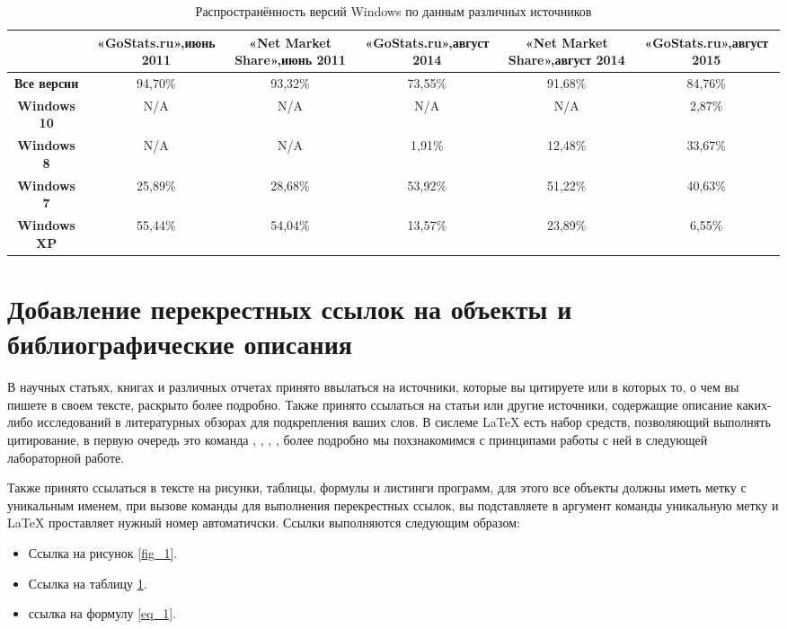 \documentclass{article} %
\begin{document}
\begin{table}[!h] %
	\centering %
	\caption{Распространённость версий Windows по данным различных источников} \label{tab_1} %
    \begin{tabular}{ |*{6}c| } %
		 \hline
            & \textbf{«GoStats.ru»,июнь 2011} & \textbf{«Net Market Share»,июнь 2011} & \textbf{«GoStats.ru»,август 2014} & \textbf{«Net Market Share»,август 2014} & \textbf{«GoStats.ru»,август 2015} \\ 
		 \hline
         \textbf{Все версии} & 94,70\% & 93,32\% & 73,55\% & 91,68\% & 84,76\% \\
 		 \hline
         \textbf{Windows 10} & N/A & N/A & N/A & N/A & 2,87\% \\ 
		 \hline
         \textbf{Windows 8} & N/A & N/A & 1,91\% & 12,48\% & 33,67\% \\ 
		 \hline
         \textbf{Windows 7} & 25,89\% & 28,68\% & 53,92\% & 51,22\% & 40,63\% \\
		 \hline
         \textbf{Windows XP} & 55,44\% & 54,04\% & 13,57\% & 23,89\% & 6,55\% \\
		 \hline

  

	\end{tabular}
\end{table}

\section{Добавление перекрестных ссылок на объекты и библиографические описания}

В научных статьях, книгах и различных отчетах принято ввылаться на источники, которые вы цитируете или в которых то, о чем вы пишете в своем тексте, раскрыто более подробно. Также принято ссылаться на статьи или другие источники, содержащие описание каких-либо исследований в литературных обзорах для подкрепления ваших слов. В сислеме \LaTeX{} есть набор средств, позволяющий выполнять цитирование, в первую очередь это команда \cite{Harrison_Cosmology}, \cite{Michie2009}, \cite{Barchi_2020}, \cite{Lee2016}, более подробно мы похзнакомимся с принципами работы с ней в следующей лабораторной работе.

Также принято ссылаться в тексте на рисунки, таблицы, формулы и листинги программ, для этого все объекты должны иметь метку с уникальным именем, при вызове команды для выполнения перекрестных ссылок, вы подставляете в аргумент команды уникальную метку и \LaTeX{} проставляет нужный номер автоматичски. Ссылки выполняются следующим образом:
\begin{itemize}
	\item Ссылка на рисунок \ref{fig_1}.
	\item Ссылка на таблицу \ref{tab_1}.
	\item ссылка на формулу \eqref{eq_1}.
\end{itemize}
\end{document}
